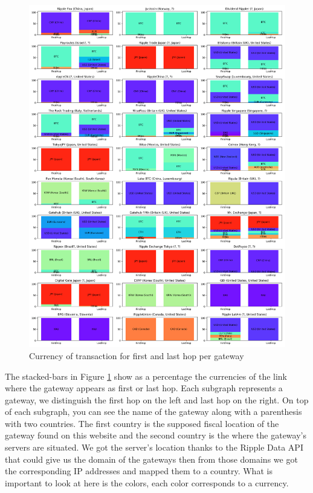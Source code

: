 \begin{figure}[h!]
    \centering
    \includegraphics[width = \linewidth]{first_last_hop_currencies_per_gateways.png}
    \caption{Currency of transaction for first and last hop per gateway}
    \label{fig:first_lap_hop_per_gateway}
\end{figure}

The stacked-bars in Figure \ref{fig:first_lap_hop_per_gateway} show as a percentage the currencies of the link where the gateway appears as first or last hop. Each subgraph represents a gateway, we distinguish the first hop on the left and last hop on the right. On top of each subgraph, you can see the name of the gateway along with a parenthesis with two countries. The first country is the supposed fiscal location of the gateway found on this website\cite{wipple} and the second country is the where the gateway's servers are situated. We got the server's location thanks to the Ripple Data API\cite{data-api} that could give us the domain of the gateways then from those domains we got the corresponding IP addresses and mapped them to a country. What is important to look at here is the colors, each color corresponds to a currency.

